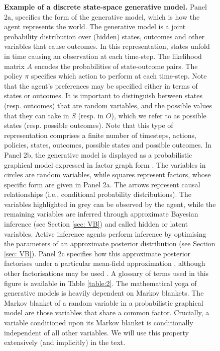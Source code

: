 \documentclass{article}
\begin{document}
\begin{figure}
    \caption{\textbf{Example of a discrete state-space generative model.} Panel 2a, specifies the form of the generative model, which is how the agent represents the world. The generative model is a joint probability distribution over (hidden) states, outcomes and other variables that cause outcomes. In this representation, states unfold in time causing an observation at each time-step. The likelihood matrix $A$ encodes the probabilities of state-outcome pairs. The policy $\pi$ specifies which action to perform at each time-step. Note that the agent's preferences may be specified either in terms of states or outcomes. It is important to distinguish between states (resp. outcomes) that are random variables, and the possible values that they can take in $S$ (resp. in $O$), which we refer to as possible states (resp. possible outcomes). Note that this type of representation comprises a finite number of timesteps, actions, policies, states, outcomes, possible states and possible outcomes. In Panel 2b, the generative model is displayed as a probabilistic graphical model \cite{bishopPatternRecognitionMachine2006,pearlGraphicalModelsProbabilistic1998,jordanIntroductionVariationalMethods1998,pearlProbabilisticReasoningIntelligent1988} expressed in factor graph form \cite{loeligerIntroductionFactorGraphs2004}. The variables in circles are random variables, while squares represent factors, whose specific form are given in Panel 2a. The arrows represent causal relationships (i.e., conditional probability distributions). The variables highlighted in grey can be observed by the agent, while the remaining variables are inferred through approximate Bayesian inference (see Section \ref{sec: VB}) and called hidden or latent variables. Active inference agents perform inference by optimising the parameters of an approximate posterior distribution (see Section \ref{sec: VB}). Panel 2c specifies how this approximate posterior factorises under a particular mean-field approximation \cite{tanakaTheoryMeanField1999}, although other factorisations may be used \cite{parrNeuronalMessagePassing2019,schwobelActiveInferenceBelief2018}. A glossary of terms used in this figure is available in Table \ref{table:2}. The mathematical yoga of generative models is heavily dependent on Markov blankets. The Markov blanket of a random variable in a probabilistic graphical model are those variables that share a common factor. Crucially, a variable conditioned upon its Markov blanket is conditionally independent of all other variables. We will use this property extensively (and implicitly) in the text.}
    \label{fig:gen mod}
\end{figure}
\end{document}
